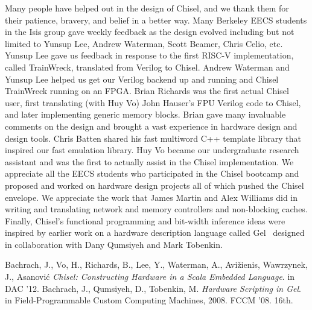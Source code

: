 \documentclass[twocolumn,10pt]{article}
\def\note#1{\noindent{\bf [Note: #1]}}
\begin{document}
Many people have helped out in the design of Chisel, and we thank them
for their patience, bravery, and belief in a better way.  Many
Berkeley EECS students in the Isis group gave weekly feedback as the
design evolved including but not limited to Yunsup Lee, Andrew
Waterman, Scott Beamer, Chris Celio, etc.  Yunsup Lee gave us feedback
in response to the first RISC-V implementation, called TrainWreck,
translated from Verilog to Chisel.  Andrew Waterman and Yunsup Lee
helped us get our Verilog backend up and running and Chisel TrainWreck
running on an FPGA.  Brian Richards was the first actual Chisel user,
first translating (with Huy Vo) John Hauser's FPU Verilog code to
Chisel, and later implementing generic memory blocks.  Brian gave many
invaluable comments on the design and brought a vast experience in
hardware design and design tools.  Chris Batten shared his fast
multiword C++ template library that inspired our fast emulation
library.  Huy Vo became our undergraduate research assistant and was
the first to actually assist in the Chisel implementation.  We
appreciate all the EECS students who participated in the Chisel
bootcamp and proposed and worked on hardware design projects all of
which pushed the Chisel envelope.  We appreciate the work that James
Martin and Alex Williams did in writing and translating network and
memory controllers and non-blocking caches.  Finally, Chisel's
functional programming and bit-width inference ideas were inspired by
earlier work on a hardware description language called Gel~\cite{gel} designed in
collaboration with Dany Qumsiyeh and Mark Tobenkin.


\begin{thebibliography}{50}
 Bachrach, J., Vo, H., Richards, B., Lee, Y., Waterman,
  A., Avi\v{z}ienis, Wawrzynek, J., Asanovi\'{c} \textsl{Chisel:
    Constructing Hardware in a Scala Embedded Language}.
in DAC '12.
 Bachrach, J., Qumsiyeh, D., Tobenkin, M. \textsl{Hardware Scripting in Gel}.
in Field-Programmable Custom Computing Machines, 2008. FCCM '08. 16th.
\end{thebibliography}
\end{document}
